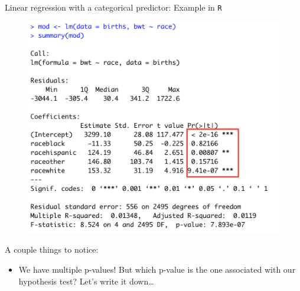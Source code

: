 \documentclass[10pt,t]{beamer}
\begin{document}
\begin{frame}{Linear regression with a categorical predictor: Example in \texttt{R}}

\begin{figure}
	\centering \includegraphics[scale=0.3]{multilevel_cat_lm3.png}
\end{figure}

\vspace{0.1cm}

A couple things to notice:
\begin{itemize}
	\item We have multiple p-values! But which p-value is the one associated with our hypothesis test? Let's write it down\dots
\end{itemize}

\end{frame}
\end{document}
